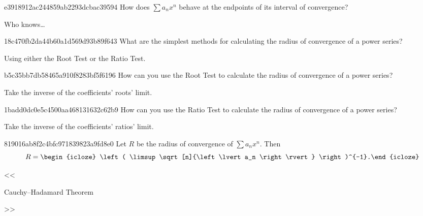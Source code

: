 \begin{note}{e3918912ac244859ab2293dcbac39594}
    How does \({ \sum a_n x^{n} }\) behave at the endpoints of its interval of convergence?

    \begin{cloze}{1}
        Who knows\ldots
    \end{cloze}
\end{note}

\begin{note}{18c470fb2da44b60a1d569d93b89f643}
    What are the simplest methods for calculating the radius of convergence of a power series?

    \begin{cloze}{1}
        Using either the Root Test or the Ratio Test.
    \end{cloze}
\end{note}

\begin{note}{b5c35bb7db58465a910f8283bf5f6196}
    How can you use the Root Test to calculate the radius of convergence of a power series?

    \begin{cloze}{1}
        Take the inverse of the coefficients' roots' limit.
    \end{cloze}
\end{note}

\begin{note}{1badd0dc0e5c4500aa468131632c62b9}
    How can you use the Ratio Test to calculate the radius of convergence of a power series?

    \begin{cloze}{1}
        Take the inverse of the coefficients' ratios' limit.
    \end{cloze}
\end{note}

\begin{note}{819016ab8f2c4bfc971839823a9fd8e0}
    Let \({ R }\) be the radius of convergence of \({ \sum a_n x^{n} }\).
    Then
    \[
        R = \begin{icloze}{1}\left( \limsup \sqrt[n]{\left\lvert a_n \right\rvert} \right)^{-1}.\end{icloze}
    \]

    \begin{center}
        \tiny
        <<\begin{icloze}{2}Cauchy–Hadamard Theorem\end{icloze}>>
    \end{center}
\end{note}

